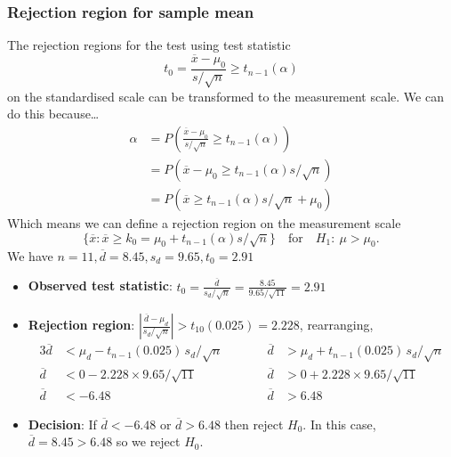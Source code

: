 \documentclass[a4paper]{article}\usepackage[]{graphicx}\usepackage[]{xcolor}
\begin{document}
\subsubsection{Rejection region for sample mean}
The rejection regions for the test using test statistic
\[
	t_0 = \frac{\overline{x} - \mu_0}{s/\sqrt{n}} \geq t_{n-1}(\alpha)
\]
on the standardised scale can be transformed to the measurement scale.
We can do this because\dots
\begin{align*}
	\alpha & = P\left( \frac{\overline{x} - \mu_0}{s/\sqrt{n}} \geq t_{n-1}(\alpha) \right) \\
	& = P\left( \overline{x} - \mu_0 \ge t_{n-1}(\alpha)s/\sqrt{n} \right) \\
	& = P\left( \overline{x} \ge t_{n-1}(\alpha)s/\sqrt{n} + \mu_0 \right)
\end{align*}
Which means we can define a rejection region on the measurement scale
\[
	\{\overline{x}: \overline{x} \ge k_0=\mu_0+t_{n-1}(\alpha) s/\sqrt{n} \} \quad \text{for} \quad  H_1\colon\ \mu > \mu_0.
\]
We have \( n = 11, \overline{d}=8.45, s_d = 9.65, t_0 = 2.91 \)
\begin{itemize}
	\item \textbf{Observed test statistic}: \( t_0 = \frac{\overline{d}}{s_d/\sqrt n} = \frac{8.45}{9.65/\sqrt{11}}= 2.91 \) 
	\item \textbf{Rejection region}: \( \left|\frac{\overline{d} - \mu_d}{ s_d/\sqrt{n} }\right| > t_{10}(0.025) = 2.228 \), rearranging,
	\begin{alignat*}{3}
		\overline{d} &< \mu_d - t_{n-1}(0.025) \, s_d/\sqrt{n} \qquad &&\overline{d}  &> \mu_d + t_{n-1}(0.025) \, s_d/\sqrt{n} \\
		\overline{d} &< 0 - 2.228 \times 9.65/\sqrt{11} \qquad &&\overline{d}  &> 0 + 2.228 \times 9.65/\sqrt{11} \\
		\overline{d} &< -6.48 \qquad &&\overline{d}  &> 6.48
		\end{alignat*}
	\item \textbf{Decision}: If \( \overline{d} < -6.48 \) or \( \overline{d} > 6.48 \) then reject \( H_0 \). In this case, \( \overline{d} = 8.45 > 6.48 \) so we reject \( H_0 \).
\end{itemize}
\end{document}
